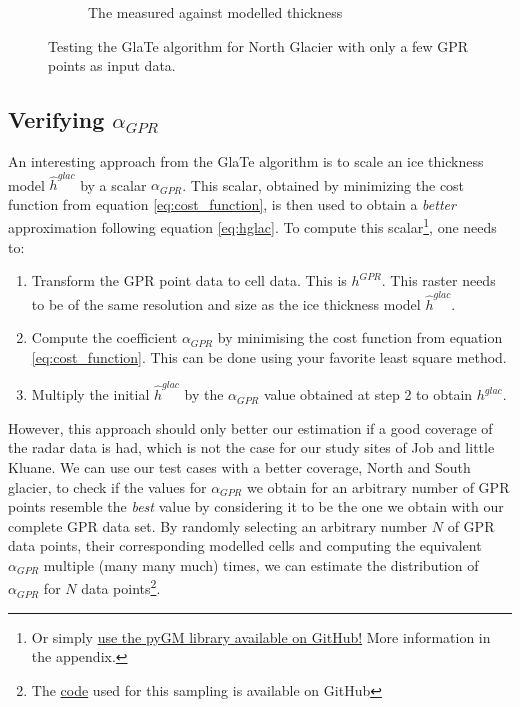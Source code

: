 \documentclass[a4, 12pt]{article}
\begin{document}
\begin{figure}[h!]
{\begin{subfigure}{0.6\linewidth}
\caption{The measured against modelled thickness}
\label{fig:ng_fewpoints_xy}
\end{subfigure}
}
\caption{Testing the GlaTe algorithm for North Glacier with only a few GPR points as input data.}
\end{figure}
\FloatBarrier

\subsection{Verifying $\alpha_{GPR}$}
An interesting approach from the GlaTe algorithm is to scale an ice thickness model $\hat{h}^{glac}$ by a scalar $\alpha_{GPR}$. This scalar, obtained by minimizing the cost function from equation \ref{eq:cost_function}, is then used to obtain a \textit{better} approximation following equation \ref{eq:hglac}. To compute this scalar\footnote{Or simply \href{https://github.com/aleximorin}{use the pyGM library available on GitHub!} More information in the appendix.}, one needs to:
\begin{enumerate}
\item Transform the GPR point data to cell data. This is $h^{GPR}$. This raster needs to be of the same resolution and size as the ice thickness model $\hat{h}^{glac}$. 
\item Compute the coefficient $\alpha_{GPR}$ by minimising the cost function from equation \ref{eq:cost_function}. This can be done using your favorite least square method.
\item Multiply the initial $\hat{h}^{glac}$ by the $\alpha_{GPR}$ value obtained at step 2 to obtain $h^{glac}$.
\end{enumerate}
However, this approach should only better our estimation if a good coverage of the radar data is had, which is not the case for our study sites of Job and little Kluane. We can use our test cases with a better coverage, North and South glacier, to check if the values for $\alpha_{GPR}$ we obtain for an arbitrary number of GPR points resemble the \textit{best} value by considering it to be the one we obtain with our complete GPR data set. By randomly selecting an arbitrary number $N$ of GPR data points, their corresponding modelled cells and computing the equivalent $\alpha_{GPR}$ multiple (many many much) times, we can estimate the distribution of $\alpha_{GPR}$ for $N$ data points\footnote{The \href{https://github.com/aleximorin/USRA-2020-AlexiMorin/blob/master/compare_alpha.py}{code} used for this sampling is available on GitHub}.
\end{document}
